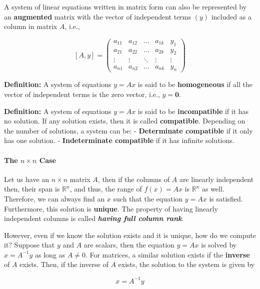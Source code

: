 \documentclass[11pt]{article}
\begin{document}
A system of linear equations written in matrix form can also be
represented by an \textbf{augmented} matrix with the vector of
independent terms \((y)\) included as a column in matrix \(A\), i.e.,

\[
[A,y] = \left(\begin{array}{cccc|c}
a_{11} & a_{12} & \ldots & a_{1k} & y_1 \\ 
a_{21} & a_{22} & \ldots & a_{2k} & y_2 \\ 
\vdots & \vdots & \ddots & \vdots & \vdots \\ 
a_{n1} & a_{n2} & \ldots & a_{nk} & y_n 
\end{array}
\right)
\]

\textbf{Definition:} A system of equations \(y = Ax\) is said to be
\textbf{homogeneous} if all the vector of independent terms is the zero
vector, i.e., \(y = \mathbf{0}\).

\textbf{Definition:} A system of equations \(y = Ax\) is said to be
\textbf{incompatible} if it has no solution. If any solution exists,
then it is called \textbf{compatible}. Depending on the number of
solutions, a system can be: - \textbf{Determinate compatible} if it only
has one solution. - \textbf{Indeterminate compatible} if it has infinite
solutions.

\hypertarget{the-ntimes-n-case}{%
\paragraph{\texorpdfstring{The \(n\times n\)
Case}{The n\textbackslash{}times n Case}}\label{the-ntimes-n-case}}

Let us have an \(n\times n\) matrix \(A\), then if the columns of \(A\)
are linearly independent then, their span is \(\mathbb{R}^n\), and thus,
the range of \(f(x) = Ax\) is \(\mathbb{R}^n\) as well. Therefore, we
can always find an \(x\) such that the equation \(y = Ax\) is satisfied.
Furthermore, this solution is \textbf{unique}. The property of having
linearly independent columns is called \textbf{\emph{having full column
rank}}.

However, even if we know the solution exists and it is unique, how do we
compute it? Suppose that \(y\) and \(A\) are scalars, then the equation
\(y = Ax\) is solved by \(x = A^{-1}y\) as long as \(A\neq 0\). For
matrices, a similar solution exists if the \textbf{inverse} of \(A\)
exists. Then, if the inverse of \(A\) exists, the solution to the system
is given by

\[
x = A^{-1}y
\]
\end{document}
